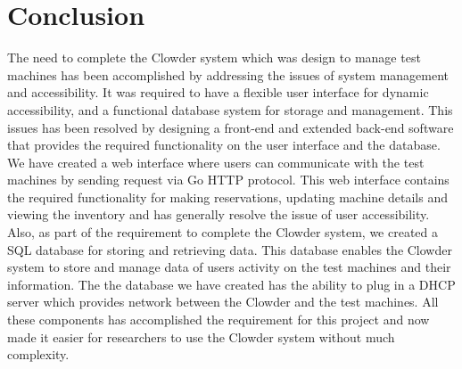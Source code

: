 \chapter{Conclusion}
\label{chap:conclusions}

The need to complete the Clowder system which was design to manage test machines has been accomplished by addressing the issues of system management and accessibility. It was required to have a flexible user interface for dynamic accessibility, and a functional database system for storage and management. This issues has been resolved by designing a front-end and extended back-end  software that provides the required functionality on the user interface and the database. We have created a web interface where users can communicate with the test machines by sending request via Go HTTP protocol. This web interface contains the required functionality for making reservations, updating machine details and viewing the inventory and has generally resolve the issue of user accessibility. Also, as part of the requirement to complete the Clowder system, we created a SQL database for storing and retrieving data. This database enables the Clowder system to store and manage data of users  activity on the test machines and their information. The the database we have created has the ability to plug in a DHCP server which provides network between the Clowder and the test machines. All these components has accomplished the requirement for this project and now made it easier for researchers to use the Clowder system without much complexity. 

